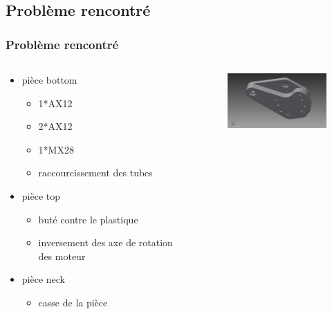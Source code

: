\subsection{Problème rencontré}
\begin{frame}
  \frametitle{Problème rencontré}
  \begin{columns}[c]
    \begin{column}[T]{0.5\textwidth}
	  \begin{itemize}
	    \item pièce bottom 
	      \begin{itemize}
	        \item 1*AX12
	        \item 2*AX12 
	        \item 1*MX28
	        \item raccourcissement des tubes
	      \end{itemize}
	    \item pièce top
	      \begin{itemize}
	        \item buté contre le plastique
	        \item inversement des axe de rotation des moteur
	      \end{itemize}
	    \item pièce neck
	      \begin{itemize}
	        \item casse de la pièce
	      \end{itemize}
	  \end{itemize}
    \end{column}
    \begin{column}[T]{0.5\textwidth}
      \begin{figure}
      	\begin{center}
      		\includegraphics[width=5cm]{../img/part_bottom_mx28_v1.jpg}
      	\end{center}      
      \end{figure}
    \end{column}
  \end{columns}
\end{frame}

